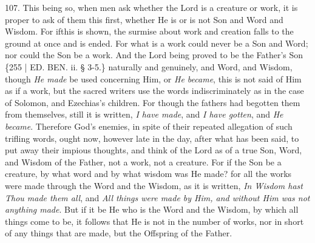 107. This being so, when men
ask whether the Lord is a creature or work, it is proper to ask of
them this first, whether He is or is not Son and Word and Wisdom. For
if\emph{}this is shown, the surmise about work and creation falls to
the ground at once and is ended. For what is a work could never be a
Son and Word; nor could the Son be a work. And the Lord being proved
to be the Father's Son \{255 | ED.
BEN.
ii. § 3-5.\} naturally and genuinely, and Word, and Wisdom, though \emph{He
made} be used concerning Him, or \emph{He became}, this is not said
of Him as if a work, but the sacred writers use the words
indiscriminately as in the case of Solomon, and Ezechias's children.
For though the fathers had begotten them from themselves, still it is
written, \emph{I have made}, and \emph{I have gotten}, and \emph{He
became}. Therefore God's enemies, in spite of their repeated
allegation of such trifling words, ought now, however late in the day,
after what has been said, to put away their impious thoughts, and
think of the Lord as of a true Son, Word, and Wisdom of the Father,
not a work, not a creature. For if the Son be a creature, by what word
and by what wisdom was He made? for all the works were made through
the Word and the Wisdom, as it is written, \emph{In Wisdom hast Thou made
them all}, and \emph{All things were made by Him, and without Him was
not anything made}. But if it be He who is the Word and the Wisdom,
by which all things come to be, it follows that He is not in the
number of works, nor in short of any things that are made, but the
Offspring of the Father.

